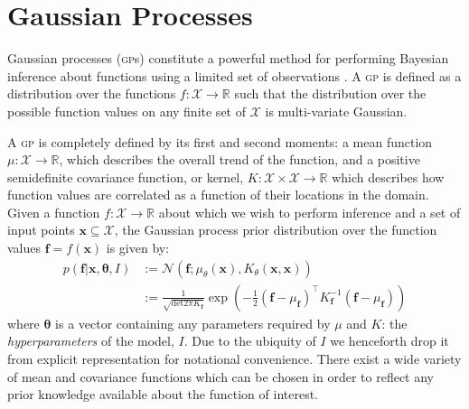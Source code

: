 \documentclass{article}
\begin{document}
\section{Gaussian Processes}

Gaussian processes ({\scshape gp}s) constitute a powerful method for performing Bayesian inference about functions using a limited set of observations \cite{rassandwill}. A {\scshape gp} is defined as a distribution over the functions $f : \mathcal{X} \rightarrow \mathbb{R}$ such that the distribution over the possible function values on any finite set of $\mathcal{X}$ is multi-variate Gaussian.

A {\scshape gp} is completely defined by its first and second moments: a mean function $\mu : \mathcal{X} \rightarrow \mathbb{R}$, which describes the overall trend of the function, and a positive semidefinite covariance function, or kernel, $K : \mathcal{X} \times \mathcal{X} \rightarrow \mathbb{R}$ which describes how function values are correlated as a function of their locations in the domain. Given a function $f : \mathcal{X} \rightarrow \mathbb{R}$ about which we wish to perform inference and a set of input points $\mathbf{x} \subseteq \mathcal{X}$, the Gaussian process prior distribution over the function values $\mathbf{f} = f(\mathbf{x})$ is given by:
\begin{align}
p(\mathbf{f} | \mathbf{x},\bm{\theta},I) &:= \mathcal{N}\left( \mathbf{f};\mu_\theta(\mathbf{x}),K_\theta(\mathbf{x},\mathbf{x}) \right) \nonumber \\
&:= \frac{1}{\sqrt{\mathrm{det} 2 \pi K_{\mathbf{f}}} } \exp \left( - \frac{1}{2} (\mathbf{f}-\mu_{\mathbf{f}})^\top K_\mathbf{f}^{-1} (\mathbf{f}-\mu_{\mathbf{f}})  \right)
\end{align}
where $\bm{\theta}$ is a vector containing any parameters required by $\mu$ and $K$: the \emph{hyperparameters} of the model, $I$. Due to the ubiquity of $I$ we henceforth drop it from explicit representation for notational convenience. %
There exist a wide variety of mean and covariance functions which can be chosen in order to reflect any prior knowledge available about the function of interest. 
\end{document}
